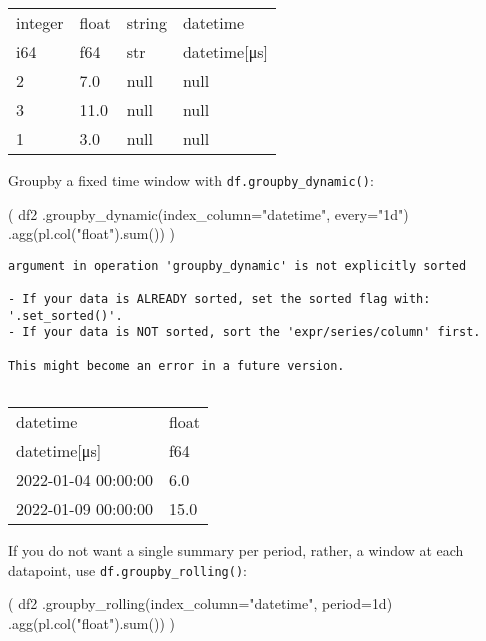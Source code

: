 \documentclass[
  letterpaper,
  DIV=11,
  numbers=noendperiod]{scrartcl}
\newenvironment{Shaded}{\begin{snugshade}}{\end{snugshade}}
\newcommand{\BuiltInTok}[1]{\textcolor[rgb]{0.00,0.23,0.31}{#1}}
\newcommand{\NormalTok}[1]{\textcolor[rgb]{0.00,0.23,0.31}{#1}}
\newcommand{\OperatorTok}[1]{\textcolor[rgb]{0.37,0.37,0.37}{#1}}
\newcommand{\StringTok}[1]{\textcolor[rgb]{0.13,0.47,0.30}{#1}}
\begin{document}
\begin{longtable}[]{@{}llll@{}}
\toprule()
integer & float & string & datetime \\
i64 & f64 & str & datetime{[}μs{]} \\
\midrule()
\endhead
2 & 7.0 & null & null \\
3 & 11.0 & null & null \\
1 & 3.0 & null & null \\
\bottomrule()
\end{longtable}

Groupby a fixed time window with \texttt{df.groupby\_dynamic()}:

\begin{Shaded}
\begin{Highlighting}[]
\NormalTok{(}
\NormalTok{  df2}
\NormalTok{  .groupby\_dynamic(index\_column}\OperatorTok{=}\StringTok{"datetime"}\NormalTok{, every}\OperatorTok{=}\StringTok{"1d"}\NormalTok{)}
\NormalTok{  .agg(pl.col(}\StringTok{"float"}\NormalTok{).}\BuiltInTok{sum}\NormalTok{())}
\NormalTok{)}
\end{Highlighting}
\end{Shaded}

\begin{verbatim}
argument in operation 'groupby_dynamic' is not explicitly sorted

- If your data is ALREADY sorted, set the sorted flag with: '.set_sorted()'.
- If your data is NOT sorted, sort the 'expr/series/column' first.

This might become an error in a future version.
    
\end{verbatim}

\begin{longtable}[]{@{}ll@{}}
\toprule()
datetime & float \\
datetime{[}μs{]} & f64 \\
\midrule()
\endhead
2022-01-04 00:00:00 & 6.0 \\
2022-01-09 00:00:00 & 15.0 \\
\bottomrule()
\end{longtable}

If you do not want a single summary per period, rather, a window at each
datapoint, use \texttt{df.groupby\_rolling()}:

\begin{Shaded}
\begin{Highlighting}[]
\NormalTok{(}
\NormalTok{  df2}
\NormalTok{  .groupby\_rolling(index\_column}\OperatorTok{=}\StringTok{"datetime"}\NormalTok{, period}\OperatorTok{=}\StringTok{\textquotesingle{}1d\textquotesingle{}}\NormalTok{)}
\NormalTok{  .agg(pl.col(}\StringTok{"float"}\NormalTok{).}\BuiltInTok{sum}\NormalTok{())}
\NormalTok{)}
\end{Highlighting}
\end{Shaded}
\end{document}
